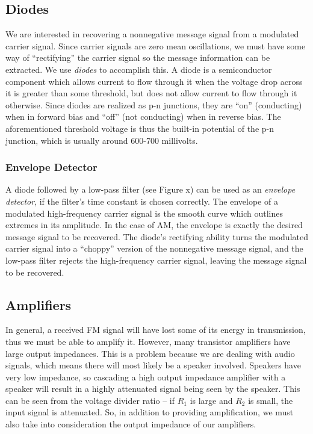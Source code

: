 \documentclass[11pt]{article}
\begin{document}
    \subsection{Diodes}
    We are interested in recovering a nonnegative message signal from a modulated carrier signal. Since carrier signals are zero mean oscillations, we must have some way of ``rectifying'' the carrier signal so the message information can be extracted. We use \emph{diodes} to accomplish this. A diode is a semiconductor component which allows current to flow through it when the voltage drop across it is greater than some threshold, but does not allow current to flow through it otherwise. Since diodes are realized as p-n junctions, they are ``on'' (conducting) when in forward bias and ``off'' (not conducting) when in reverse bias. The aforementioned threshold voltage is thus the built-in potential of the p-n junction, which is usually around 600-700 millivolts. 
    
        \subsubsection{Envelope Detector}
        A diode followed by a low-pass filter (see Figure x) can be used as an \emph{envelope detector}, if the filter's time constant is chosen correctly. The envelope of a modulated high-frequency carrier signal is the smooth curve which outlines extremes in its amplitude. In the case of AM, the envelope is exactly the desired message signal to be recovered. The diode's rectifying ability turns the modulated carrier signal into a ``choppy'' version of the nonnegative message signal, and the low-pass filter rejects the high-frequency carrier signal, leaving the message signal to be recovered.
    
    \subsection{Amplifiers}
    In general, a received FM signal will have lost some of its energy in transmission, thus we must be able to amplify it. However, many transistor amplifiers have large output impedances. This is a problem because we are dealing with audio signals, which means there will most likely be a speaker involved. Speakers have very low impedance, so cascading a high output impedance amplifier with a speaker will result in a highly attenuated signal being seen by the speaker. This can be seen from the voltage divider ratio -- if $R_1$ is large and $R_2$ is small, the input signal is attenuated. So, in addition to providing amplification, we must also take into consideration the output impedance of our amplifiers.
\end{document}
